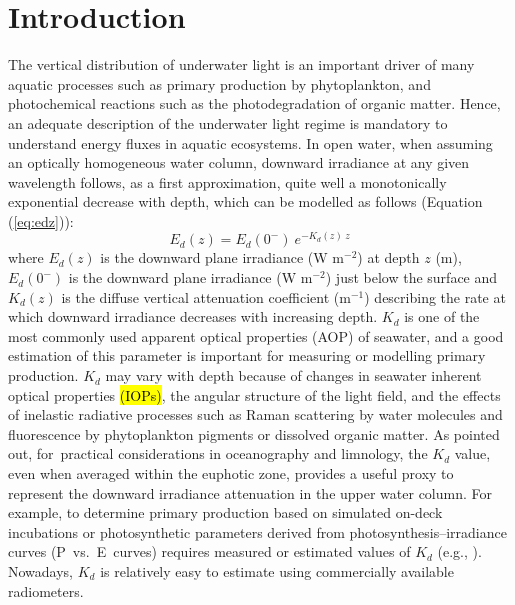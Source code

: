 \documentclass[applsci,article,accept,moreauthors,pdftex,10pt,a4paper]{Definitions/mdpi}
\newcommand{\ked}{\ensuremath{K_{d}}}
\newcommand{\edz}{\ensuremath{{E_d(z)}}}
\newcommand{\edzero}{\ensuremath{{E_d(0^-)}}}
\begin{document}
\section{Introduction}

The vertical distribution of underwater light is an important driver of many aquatic processes such as primary production by phytoplankton, and photochemical reactions such as the photodegradation of organic matter. Hence, an adequate description of the underwater light regime is mandatory to understand energy fluxes in aquatic ecosystems. In open water, when assuming an optically homogeneous water column, downward irradiance at any given wavelength follows, as a first approximation, quite well a monotonically exponential decrease with depth, which can be modelled as follows \citep{Kirk1994} (Equation (\ref{eq:edz})):
\begin{equation}
    \edz{} = \edzero{}~e^{-\ked(z)~z}
    \label{eq:edz}
\end{equation}
where \edz{} is the downward plane irradiance (W m$^{-2}$) at depth $z$ (m), \edzero{} is the downward plane irradiance (W m$^{-2}$) just below the surface and $K_d(z)$ is the diffuse vertical attenuation coefficient \mbox{(m$^{-1}$)} describing the rate at which downward irradiance decreases with increasing depth. \ked{} is one of the most commonly used apparent optical properties (AOP) of seawater, and a good estimation of this parameter is important for measuring or modelling primary production. \ked{} may vary with depth because of changes in seawater inherent optical properties \hl{(IOPs)}, the angular structure of the light field, and the effects of inelastic radiative processes such as Raman scattering by water molecules and fluorescence by phytoplankton pigments or dissolved organic matter. As \citet{Kirk1994} pointed out, for~practical considerations in oceanography and limnology, the \ked{} value, even when averaged within the euphotic zone, provides a useful proxy to represent the downward irradiance attenuation in the upper water column. For example, to determine primary production based on simulated on-deck incubations or photosynthetic parameters derived from photosynthesis--irradiance curves (P~vs.~E~curves) requires measured or estimated values of \ked{} (e.g., \citet{Morel1996}). Nowadays, \ked{} is relatively easy to estimate using commercially available radiometers.
\end{document}
